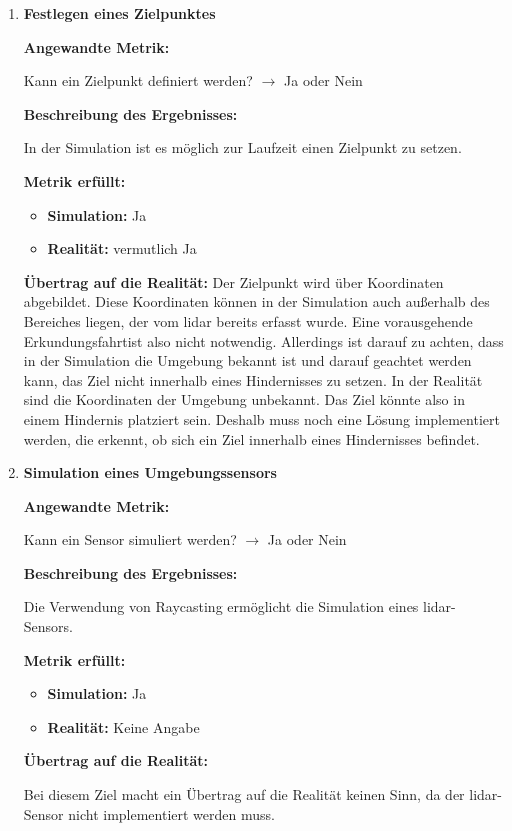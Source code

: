 \begin{enumerate}[leftmargin=*]
    \item \textbf{Festlegen eines Zielpunktes}

    \textbf{Angewandte Metrik:}

    Kann ein Zielpunkt definiert werden? $\to$ Ja oder Nein

    \textbf{Beschreibung des Ergebnisses:}

    In der Simulation ist es möglich zur Laufzeit einen Zielpunkt zu setzen. 

    \textbf{Metrik erfüllt:}
    \begin{itemize}
        \item \textbf{Simulation:} Ja
        \item \textbf{Realität:} vermutlich Ja
    \end{itemize}
    
    \textbf{Übertrag auf die Realität:}
    Der Zielpunkt wird über Koordinaten abgebildet. 
    Diese Koordinaten können in der Simulation auch außerhalb des Bereiches liegen, der vom \ac{lidar} bereits erfasst wurde.
    Eine vorausgehende \glqq Erkundungsfahrt\grqq ist also nicht notwendig.
    Allerdings ist darauf zu achten, dass in der Simulation die Umgebung bekannt ist und darauf geachtet werden kann,
    das Ziel nicht innerhalb eines Hindernisses zu setzen.
    In der Realität sind die Koordinaten der Umgebung unbekannt. 
    Das Ziel könnte also in einem Hindernis platziert sein.
    Deshalb muss noch eine Lösung implementiert werden, die erkennt, ob sich ein Ziel innerhalb eines Hindernisses befindet.


    \item \textbf{Simulation eines Umgebungssensors}

    \textbf{Angewandte Metrik:}

    Kann ein Sensor simuliert werden? $\to$ Ja oder Nein

    \textbf{Beschreibung des Ergebnisses:}

    Die Verwendung von Raycasting ermöglicht die Simulation eines \ac{lidar}-Sensors.      

    \textbf{Metrik erfüllt:}
    \begin{itemize}
        \item \textbf{Simulation:} Ja
        \item \textbf{Realität:} Keine Angabe
    \end{itemize}
    
    \textbf{Übertrag auf die Realität:}

    Bei diesem Ziel macht ein Übertrag auf die Realität keinen Sinn, da der \ac{lidar}-Sensor nicht implementiert werden muss.


\end{enumerate}
